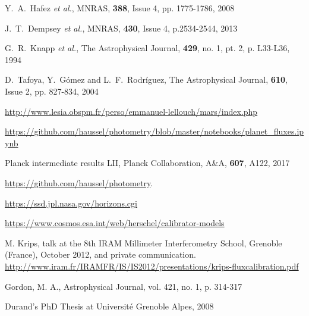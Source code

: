 \begin{thebibliography}{99}
  Y.~A.~Hafez {\it et al.}, 
  MNRAS, {\bf 388}, Issue 4, pp. 1775-1786, 2008

  J.~T.~Dempsey {\it et al.},  
  MNRAS, {\bf 430}, Issue 4, p.2534-2544, 2013

  G.~R.~Knapp {\it et al.},  
The Astrophysical Journal, {\bf 429}, no. 1, pt. 2, p. L33-L36, 1994

  D.~Tafoya, Y.~G\'omez and  L.~F.~Rodr\'iguez, 	
The Astrophysical Journal, {\bf 610}, Issue 2, pp. 827-834, 2004

\url{http://www.lesia.obspm.fr/perso/emmanuel-lellouch/mars/index.php}

\url{https://github.com/haussel/photometry/blob/master/notebooks/planet_fluxes.ipynb}

Planck intermediate results LII, Planck
Collaboration, A$\&$A, {\bf 607}, A122, 2017

\url{https://github.com/haussel/photometry}.

\url{https://ssd.jpl.nasa.gov/horizons.cgi}

\url{https://www.cosmos.esa.int/web/herschel/calibrator-models}

 M. Krips, talk at the 8th 
IRAM Millimeter Interferometry School, Grenoble (France),  October 2012, and
private communication.\\
\url{http://www.iram.fr/IRAMFR/IS/IS2012/presentations/krips-fluxcalibration.pdf}

 Gordon, M. A., Astrophysical Journal, vol. 421, no. 1, p. 314-317

 Durand's PhD Thesis at
Universit\'e Grenoble Alpes, 2008

  

\end{thebibliography}
